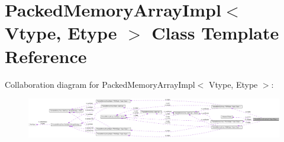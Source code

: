 \hypertarget{class_packed_memory_array_impl}{
\section{PackedMemoryArrayImpl$<$ Vtype, Etype $>$ Class Template Reference}
\label{class_packed_memory_array_impl}
}


Collaboration diagram for PackedMemoryArrayImpl$<$ Vtype, Etype $>$:\nopagebreak
\begin{figure}[H]
\begin{center}
\leavevmode
\includegraphics[width=400pt]{class_packed_memory_array_impl__coll__graph}
\end{center}
\end{figure}
